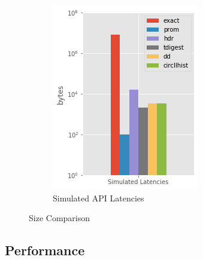 \documentclass{article}
\theoremstyle{plain}
\theoremstyle{remark}
\begin{document}
\begin{figure}[t!]
\begin{subfigure}[t]{0.3\textwidth}
      \includegraphics[width=\textwidth]{evaluation/images/Simulated_Latencies_size.png}
      \caption{Simulated API Latencies}
    \end{subfigure}
    \caption{Size Comparison}
\end{figure}



\clearpage
\subsection{Performance}
\end{document}
